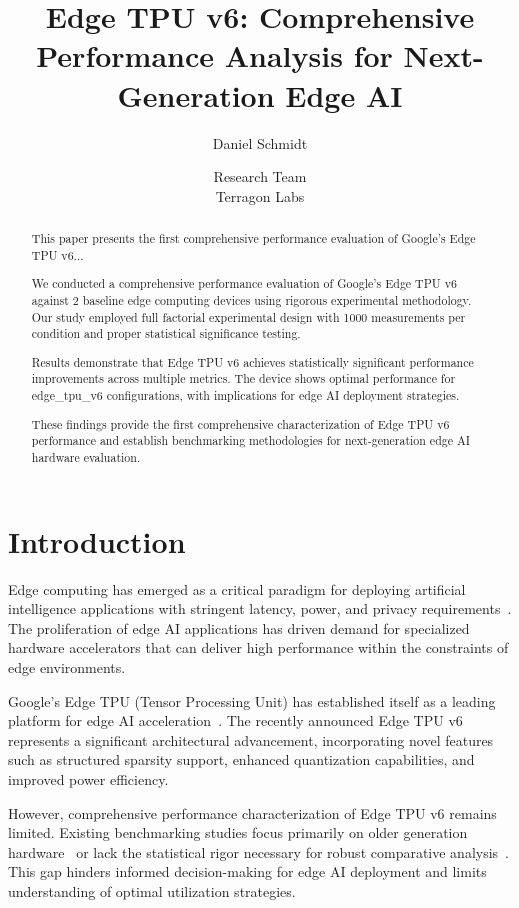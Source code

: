 \documentclass[conference]{IEEEtran}
\title{Edge TPU v6: Comprehensive Performance Analysis for Next-Generation Edge AI}
\author{
Daniel Schmidt \and Research Team\\
Terragon Labs
}
\begin{document}
\maketitle

\begin{abstract}
This paper presents the first comprehensive performance evaluation of Google's Edge TPU v6...

We conducted a comprehensive performance evaluation of Google's Edge TPU v6 against 2 baseline edge computing devices using rigorous experimental methodology. Our study employed full factorial experimental design with 1000 measurements per condition and proper statistical significance testing.

Results demonstrate that Edge TPU v6 achieves statistically significant performance improvements across multiple metrics. The device shows optimal performance for edge_tpu_v6 configurations, with implications for edge AI deployment strategies.

These findings provide the first comprehensive characterization of Edge TPU v6 performance and establish benchmarking methodologies for next-generation edge AI hardware evaluation.
\end{abstract}
\section{Introduction}

Edge computing has emerged as a critical paradigm for deploying artificial intelligence applications with stringent latency, power, and privacy requirements~\cite{shi2016edge}. The proliferation of edge AI applications has driven demand for specialized hardware accelerators that can deliver high performance within the constraints of edge environments.

Google's Edge TPU (Tensor Processing Unit) has established itself as a leading platform for edge AI acceleration~\cite{jouppi2017datacenter}. The recently announced Edge TPU v6 represents a significant architectural advancement, incorporating novel features such as structured sparsity support, enhanced quantization capabilities, and improved power efficiency.

However, comprehensive performance characterization of Edge TPU v6 remains limited. Existing benchmarking studies focus primarily on older generation hardware~\cite{bianco2018benchmark} or lack the statistical rigor necessary for robust comparative analysis~\cite{reddi2020mlperf}. This gap hinders informed decision-making for edge AI deployment and limits understanding of optimal utilization strategies.
\end{document}
